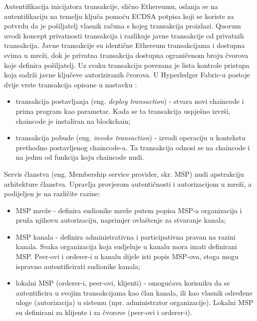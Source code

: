 \documentclass[times, utf8, diplomski]{fer}
\begin{document}
Autentifikacija inicijatora transakcije, slično Ethereumu, oslanja se na autentifikaciju na temelju ključa pomoću ECDSA potpisa koji se koriste za potvrdu da je pošiljatelj vlasnik računa s kojeg transakcija proizlazi. Quorum uvodi koncept privatnosti transakcija i razlikuje javne transakcije od privatnih transakcija. Javne transakcije su identične Ethereum transakcijama i dostupna svima u mreži, dok je privatna transakcija dostupna ograničenom broju čvorova koje definira pošiljatelj. Uz svaku transakciju povezana je lista kontrole pristupa koja sadrži javne ključeve autoriziranih čvorova.
U Hyperledger Fabric-u postoje dvije vrste transakcija opisane u nastavku \cite{lagarde2019security}:

\begin{itemize}

\item transakcija postavljanja (eng. \textit{deploy transaction}) - stvara novi chaincode i prima program kao parametar. Kada se ta transakcija uspješno izvrši, chaincode je instaliran na blockchain;

\item transakcija pobude (eng. \textit{invoke transaction}) - izvodi operaciju u kontekstu prethodno postavljenog chaincode-a. Ta transakcija odnosi se na chaincode i na jednu od funkcija koju chaincode nudi.

\end{itemize}

Servis članstva (eng. Membership service provider, skr. MSP) nudi apstrakciju arhitekture članstva. Upravlja provjerom autentičnosti i autorizacijom u mreži, a podijeljen je na različite razine:

\begin{itemize}

\item MSP mreže - definira sudionike mreže putem popisa MSP-a organizacija i pruža njihovu autorizaciju, naprimjer ovlaštenje za stvaranje kanala;

\item MSP kanala - definira administrativna i participativna pravan na razini kanala. Svaka organizacija koja sudjeluje u kanalu mora imati definirani MSP. Peer-ovi i orderer-i u kanalu dijele isti popis MSP-ova, stoga mogu ispravno autentificirati sudionike kanala;

\item lokalni MSP (orderer-i, peer-ovi, klijenti) - omogućava korisniku da se autentificira u svojim transakcijama kao član kanala, ili kao vlasnik određene uloge (autorizacija) u sistemu (npr. administrator organizacije). Lokalni MSP su definirani za klijente i za čvorove (peer-ovi i orderer-i).

\end{itemize}
\end{document}
